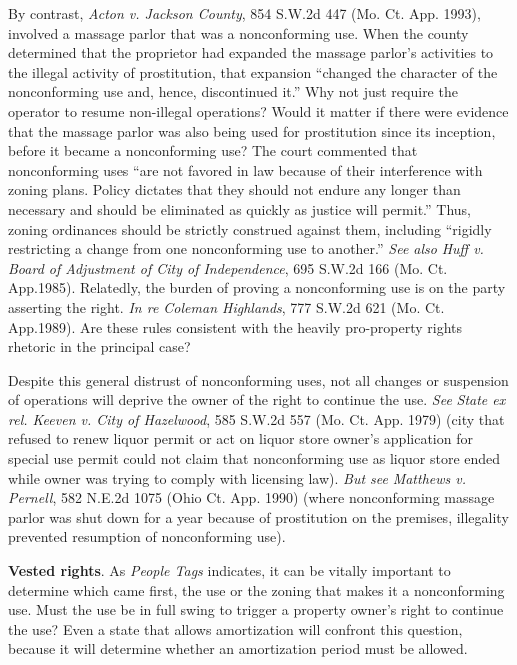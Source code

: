 By contrast, \textit{Acton v. Jackson County}, 854 S.W.2d 447 (Mo. Ct. App.
1993), involved a massage parlor that was a nonconforming use. When the county
determined that the proprietor had expanded the massage parlor's activities to
the illegal activity of prostitution, that expansion ``changed the character of
the nonconforming use and, hence, discontinued it.'' Why not just require the
operator to resume non-illegal operations? Would it matter if there were
evidence that the massage parlor was also being used for prostitution since its
inception, before it became a nonconforming use? The court commented that
nonconforming uses ``are not favored in law because of their interference with
zoning plans. Policy dictates that they should not endure any longer than
necessary and should be eliminated as quickly as justice will permit.'' Thus,
zoning ordinances should be strictly construed against them, including ``rigidly
restricting a change from one nonconforming use to another.'' \textit{See also}
\emph{Huff v. Board of Adjustment of City of Independence}, 695 S.W.2d 166 (Mo.
Ct. App.1985). Relatedly, the burden of proving a nonconforming use is on the
party asserting the right. \emph{In re Coleman Highlands}, 777 S.W.2d 621 (Mo.
Ct. App.1989). Are these rules consistent with the heavily pro-property rights
rhetoric in the principal case?

\item
Despite this general distrust of nonconforming uses, not all changes or
suspension of operations will deprive the owner of the right to continue the
use. \textit{See} \emph{State ex rel. Keeven v. City of Hazelwood}, 585 S.W.2d
557 (Mo. Ct. App. 1979) (city that refused to renew liquor permit or act on
liquor store owner's application for special use permit could not claim that
nonconforming use as liquor store ended while owner was trying to comply with
licensing law). \textit{But see} \emph{Matthews v. Pernell}, 582 N.E.2d 1075
(Ohio Ct. App. 1990) (where nonconforming massage parlor was shut down for a
year because of prostitution on the premises, illegality prevented resumption of
nonconforming use).

\item
\textbf{Vested rights}. As \textit{People Tags} indicates, it can be vitally
important to determine which came first, the use or the zoning that makes it a
nonconforming use. Must the use be in full swing to trigger a property owner's
right to continue the use? Even a state that allows amortization will confront
this question, because it will determine whether an amortization period must be
allowed.

